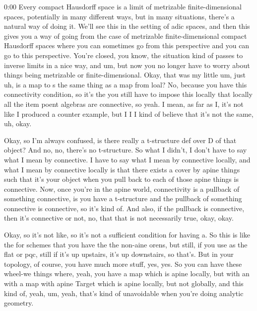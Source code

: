 \begin{unfinished}{0:00}
Every compact Hausdorff space is a limit of metrizable finite-dimensional spaces, potentially in many different ways, but in many situations, there's a natural way of doing it. We'll see this in the setting of adic spaces, and then this gives you a way of going from the case of metrizable finite-dimensional compact Hausdorff spaces where you can sometimes go from this perspective and you can go to this perspective.
You're closed, you know, the situation kind of passes to inverse limits in a nice way, and um, but now you no longer have to worry about things being metrizable or finite-dimensional. Okay, that was my little um, just uh, is a map to s the same thing as a map from loal? No, because you have this connectivity condition, so it's the you still have to impose this locally that locally all the item poent algebras are connective, so yeah. I mean, as far as I, it's not like I produced a counter example, but I I I kind of believe that it's not the same, uh, okay.

Okay, so I'm always confused, is there really a t-structure def over D of that object? And no, no, there's no t-structure. So what I didn't, I don't have to say what I mean by connective. I have to say what I mean by connective locally, and what I mean by connective locally is that there exists a cover by apine things such that it's your object when you pull back to each of those apine things is connective. Now, once you're in the apine world, connectivity is a pullback of something connective, is you have a t-structure and the pullback of something connective is connective, so it's kind of. And also, if the pullback is connective, then it's connective or not, no, that that is not necessarily true, okay, okay.

Okay, so it's not like, so it's not a sufficient condition for having a. So this is like the for schemes that you have the the non-aine orens, but still, if you use as the flat or pqc, still if it's up upstairs, it's up downstairs, so that's. But in your topology, of course, you have much more stuff, yes, yes. So you can have these wheel-we things where, yeah, you have a map which is apine locally, but with an with a map with apine Target which is apine locally, but not globally, and this kind of, yeah, um, yeah, that's kind of unavoidable when you're doing analytic geometry.


\end{unfinished}
